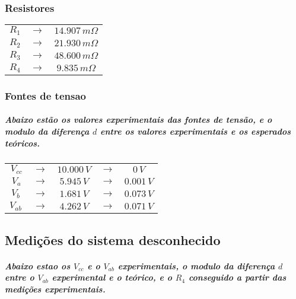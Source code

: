 \documentclass[12pt,twoside, a4paper, twocolumn]{article}
\begin{document}
\subsubsection{Resistores}

\begin{center}
    \begin{tabular}{ |ccc| }
        \hline
        $R_1$ & $\rightarrow$ & $14.907\, m\varOmega$ \\
        $R_2$ & $\rightarrow$ & $21.930\, m\varOmega$ \\
        $R_3$ & $\rightarrow$ & $48.600\, m\varOmega$ \\
        $R_4$ & $\rightarrow$ & $9.835\, m\varOmega$  \\
        \hline
    \end{tabular}
\end{center}

\subsubsection{Fontes de tensao}
\subparagraph*{Abaixo estão os valores experimentais das fontes de tensão, e o modulo da diferença $d$ entre os valores experimentais e os esperados teóricos.}

\begin{center}
    \begin{tabular}{ |ccccc| }
        \hline
        $V_{cc}$   & $\rightarrow$ & $10.000\,V$ & $\rightarrow$ & $0\,V$      \\
        $V_{a}$    & $\rightarrow$ & $5.945\, V$ & $\rightarrow$ & $0.001 \,V$ \\
        $V_{b}\,$  & $\rightarrow$ & $1.681\, V$ & $\rightarrow$ & $0.073\,V$  \\
        $V_{ab}\,$ & $\rightarrow$ & $4.262\, V$ & $\rightarrow$ & $0.071\,V$  \\
        \hline
    \end{tabular}
\end{center}

\subsection{Medições do sistema desconhecido}

\subparagraph{Abaixo estao os $V_{cc}$ e o $V_{ab}$ experimentais, o modulo da diferença $d$ entre o $V_{ab}$ experimental e o teórico, e o $R_4$ conseguido a partir das medições experimentais.}
\end{document}
